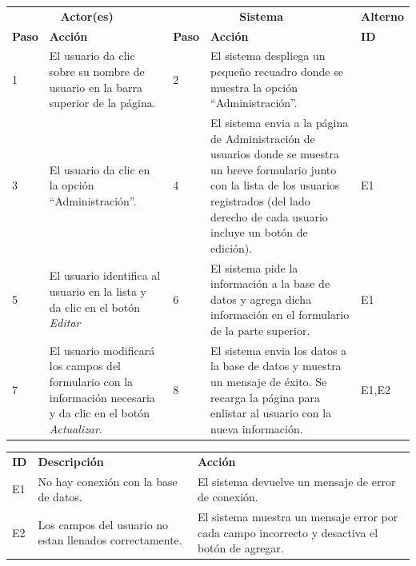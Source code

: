 \documentclass[10pt,letterpaper]{article}
\begin{document}
\begin{adjustwidth}{-6em}{-6em}
	\begin{center}
		\begin{tabularx}{1.2\textwidth}{ | p{0.7cm} | X | p{0.7cm} | X | p{1.5cm} | }
			\hline
			\rowcolor{NewBlue} \multicolumn{5}{|c|}{\textbf{Flujo normal de eventos}} \\
			\hline
			\multicolumn{2}{|c|}{\textbf{Actor(es)}}	&	\multicolumn{2}{c|}{\textbf{Sistema}}	&	\textbf{Alterno} \\
			\hline
			\textbf{Paso}	&	\textbf{Acción}	&	\textbf{Paso}	&	\textbf{Acción}	&	\textbf{ID} \\
			\hline
			1 & 
			El usuario da clic sobre su nombre de usuario en la barra superior de la página.&
			2 &
			El sistema despliega un pequeño recuadro donde se muestra la opción ``Administración''. &
			
			\\
			\hline
			3 & 
			El usuario da clic en la opción ``Administración''.&
			4 &
			El sistema envia a la página de Administración de usuarios donde se muestra un breve formulario junto con la lista de los usuarios registrados (del lado derecho de cada usuario incluye un botón de edición).&
			E1
			\\
			\hline
			5 & 
			El usuario identifica al usuario en la lista y da clic en el botón \textit{Editar}&
			6 &
			El sistema pide la información a la base de datos y agrega dicha información en el formulario de la parte superior.&
			E1
			\\
			\hline
			7 & 
			El usuario modificará los campos del formulario con la información necesaria y da clic en el botón \textit{Actualizar}.&
			8 &
			El sistema envia los datos a la base de datos y muestra un mensaje de éxito. Se recarga la página para enlistar al usuario con la nueva información.&
			E1,E2
			\\
			\hline
		\end{tabularx}
	\end{center}
\end{adjustwidth}

\begin{adjustwidth}{-6em}{-6em}
	\begin{center}
		\begin{tabularx}{1.2\textwidth}{ | p{0.6cm} | X | X | }
			\hline
			\rowcolor{NewBlue} \multicolumn{3}{|c|}{\textbf{Flujo excepcional de eventos}} \\
			\hline
			\textbf{ID}	&	\textbf{Descripción}	&	\textbf{Acción} \\
			\hline
			E1 &
			No hay conexión con la base de datos. &
			El sistema devuelve un mensaje de error de conexión. \\
			\hline
			E2 &
			Los campos del usuario no estan llenados correctamente. &
			El sistema muestra un mensaje error por cada campo incorrecto y desactiva el botón de agregar. \\
			\hline
		\end{tabularx}
	\end{center}
\end{adjustwidth}
\end{document}
